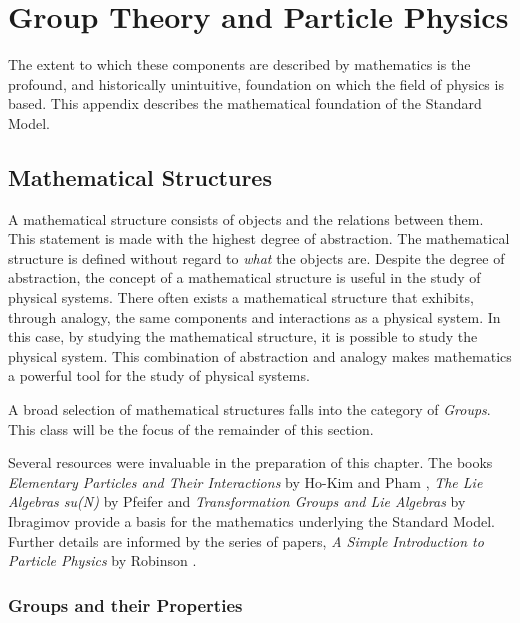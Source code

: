 \chapter{Group Theory and Particle Physics}\label{sec:groups}

The extent to which these components are described by mathematics is the profound, and historically unintuitive, foundation on which the field of physics is based.
This appendix describes the mathematical foundation of the Standard Model.

\section{Mathematical Structures}\label{sec:math}

A mathematical structure consists of objects and the relations between them.
This statement is made with the highest degree of abstraction. The mathematical structure is defined without regard to \emph{what} the objects are.
Despite the degree of abstraction, the concept of a mathematical structure is useful in the study of physical systems.
There often exists a mathematical structure that exhibits, through analogy, the same components and interactions as a physical system.
In this case, by studying the mathematical structure, it is possible to study the physical system.
This combination of abstraction and analogy makes mathematics a powerful tool for the study of physical systems.

A broad selection of mathematical structures falls into the category of  \emph{Groups}.
This class will be the focus of the remainder of this section.

Several resources were invaluable in the preparation of this chapter.
The books \emph{Elementary Particles and Their Interactions} by Ho-Kim and Pham \cite{hokim}, \emph{The Lie Algebras su(N)} by Pfeifer\cite{pfeifer} and \emph{Transformation Groups and Lie Algebras} by Ibragimov\cite{ibragimov} provide a basis for the mathematics underlying the Standard Model.
Further details are informed by the series of papers, \emph{A Simple Introduction to Particle Physics} by Robinson \etal \cite{robinson}.

\subsection{Groups and their Properties}

